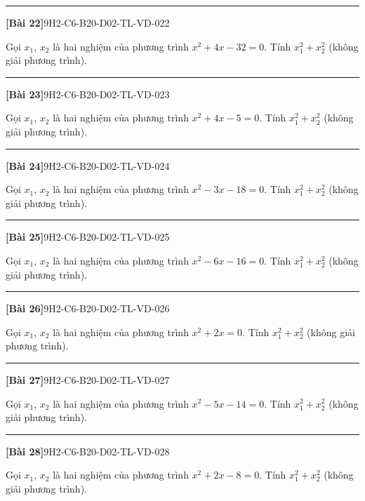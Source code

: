 \documentclass[12pt,a4paper]{article}
\newif\ifloigiai
\newenvironment{cauhoi}[2]{%
  \par\medskip\noindent\rule{\textwidth}{0.4pt}\par\nopagebreak
  \noindent\textbf{[#1]}\hfill{\scriptsize\ttfamily #2}\par\nopagebreak\smallskip}{\par}
\newcommand{\loigiai}[1]{\ifloigiai\par\smallskip\noindent\textit{Lời giải.} #1\par\fi}
\begin{document}
\begin{cauhoi}{Bài 22}{9H2-C6-B20-D02-TL-VD-022}
Gọi $x_1$, $x_2$ là hai nghiệm của phương trình $x^{2}+4x-32=0$. Tính $x_1^{2}+x_2^{2}$ (không giải phương trình).
\loigiai{Theo định lí Viète: $x_1+x_2=-4$, $x_1x_2=-32$. Suy ra $x_1^{2}+x_2^{2}=(x_1+x_2)^{2}-2x_1x_2=-4^{2}-2\cdot(-32)=80$.}
\end{cauhoi}
\begin{cauhoi}{Bài 23}{9H2-C6-B20-D02-TL-VD-023}
Gọi $x_1$, $x_2$ là hai nghiệm của phương trình $x^{2}+4x-5=0$. Tính $x_1^{2}+x_2^{2}$ (không giải phương trình).
\loigiai{Theo định lí Viète: $x_1+x_2=-4$, $x_1x_2=-5$. Suy ra $x_1^{2}+x_2^{2}=(x_1+x_2)^{2}-2x_1x_2=-4^{2}-2\cdot(-5)=26$.}
\end{cauhoi}
\begin{cauhoi}{Bài 24}{9H2-C6-B20-D02-TL-VD-024}
Gọi $x_1$, $x_2$ là hai nghiệm của phương trình $x^{2}-3x-18=0$. Tính $x_1^{2}+x_2^{2}$ (không giải phương trình).
\loigiai{Theo định lí Viète: $x_1+x_2=3$, $x_1x_2=-18$. Suy ra $x_1^{2}+x_2^{2}=(x_1+x_2)^{2}-2x_1x_2=3^{2}-2\cdot(-18)=45$.}
\end{cauhoi}
\begin{cauhoi}{Bài 25}{9H2-C6-B20-D02-TL-VD-025}
Gọi $x_1$, $x_2$ là hai nghiệm của phương trình $x^{2}-6x-16=0$. Tính $x_1^{2}+x_2^{2}$ (không giải phương trình).
\loigiai{Theo định lí Viète: $x_1+x_2=6$, $x_1x_2=-16$. Suy ra $x_1^{2}+x_2^{2}=(x_1+x_2)^{2}-2x_1x_2=6^{2}-2\cdot(-16)=68$.}
\end{cauhoi}
\begin{cauhoi}{Bài 26}{9H2-C6-B20-D02-TL-VD-026}
Gọi $x_1$, $x_2$ là hai nghiệm của phương trình $x^{2}+2x=0$. Tính $x_1^{2}+x_2^{2}$ (không giải phương trình).
\loigiai{Theo định lí Viète: $x_1+x_2=-2$, $x_1x_2=0$. Suy ra $x_1^{2}+x_2^{2}=(x_1+x_2)^{2}-2x_1x_2=-2^{2}-2\cdot(0)=4$.}
\end{cauhoi}
\begin{cauhoi}{Bài 27}{9H2-C6-B20-D02-TL-VD-027}
Gọi $x_1$, $x_2$ là hai nghiệm của phương trình $x^{2}-5x-14=0$. Tính $x_1^{2}+x_2^{2}$ (không giải phương trình).
\loigiai{Theo định lí Viète: $x_1+x_2=5$, $x_1x_2=-14$. Suy ra $x_1^{2}+x_2^{2}=(x_1+x_2)^{2}-2x_1x_2=5^{2}-2\cdot(-14)=53$.}
\end{cauhoi}
\begin{cauhoi}{Bài 28}{9H2-C6-B20-D02-TL-VD-028}
Gọi $x_1$, $x_2$ là hai nghiệm của phương trình $x^{2}+2x-8=0$. Tính $x_1^{2}+x_2^{2}$ (không giải phương trình).
\loigiai{Theo định lí Viète: $x_1+x_2=-2$, $x_1x_2=-8$. Suy ra $x_1^{2}+x_2^{2}=(x_1+x_2)^{2}-2x_1x_2=-2^{2}-2\cdot(-8)=20$.}
\end{cauhoi}
\end{document}
